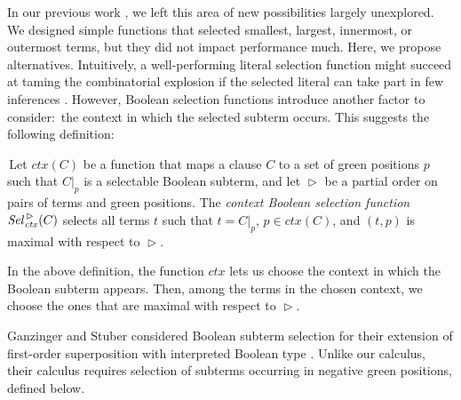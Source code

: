 \documentclass[smallcondensed,draft]{svjour3}     %
\begin{document}
In our previous work \cite{nbtv-2021-foboolsup}, we left this area of new
possibilities largely unexplored. We designed simple functions that selected
smallest, largest, innermost, or outermost terms, but they did not impact
performance much. Here, we propose alternatives.
%
Intuitively, a well-performing literal selection
function might succeed at taming the combinatorial explosion if the
selected literal can take part in few inferences
\cite{hrsv-16-selsel}. However, Boolean selection functions
introduce another factor to consider:\ the context in which the selected
subterm occurs. This suggests the following definition:

\begin{definitionx}
  \label{def:context-bool-sel}
  \,Let $\mathit{ctx}(C)$ be a function that maps a clause $C$ to a set of green positions
  $p$ such that $C|_p$ is a selectable Boolean subterm, and let
  $\vartriangleright$ be a partial order on pairs of terms and green positions.
  The \emph{context
  Boolean selection function} $\mathit{Sel\/}_{\mathit{ctx}}^{\,\vartriangleright}(C)$
  selects all terms $t$ such that $t=C|_p$, $p \in \mathit{ctx}(C)$, and
  $(t,p)$ is maximal with respect to $\vartriangleright$.
\end{definitionx}

In the above definition, the function $\mathit{ctx}$ lets
us choose the context in which the Boolean subterm appears. Then, among
the terms in the chosen context, we choose the ones that are maximal with
respect to $\vartriangleright$.

Ganzinger and Stuber considered Boolean subterm selection for their extension of
first-order superposition with interpreted Boolean type \cite{gs-05-boolsup}. Unlike our calculus, their calculus requires
selection of subterms occurring in negative green positions, defined below.
\end{document}
